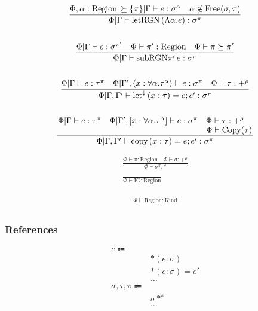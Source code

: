 \documentclass {article}
\begin{document}
\begin{gather*}
\frac
{\Phi , \alpha : \text{Region} \, \succeq \{ \pi \} | \Gamma \vdash e : \sigma^\alpha \quad \alpha \notin \text{Free}(\sigma, \pi)}
{\Phi | \Gamma \vdash \text{letRGN} \, (\Lambda \alpha. e) : \sigma^\pi} \\
\\
\frac
{\Phi | \Gamma \vdash e : \sigma^{\pi'} \quad \Phi \vdash \pi' : \text{Region} \quad \Phi \vdash \pi \succeq \pi' }
{\Phi | \Gamma \vdash \text{subRGN} \pi' \, e : \sigma^{\pi} } \\
\\
\frac
{\Phi | \Gamma \vdash e : \tau^\pi \quad \Phi | \Gamma', \langle x : \forall \alpha. \tau^\alpha \rangle \vdash e : \sigma^\pi \quad \Phi \vdash \tau : +^{\rho}}
{\Phi | \Gamma, \Gamma' \vdash \text{let}^\downarrow \, (x : \tau) = e; e' : \sigma^\pi} \\
\\
\frac
{\splitfrac{\Phi | \Gamma \vdash e : \tau^\pi \quad \Phi | \Gamma', [ x : \forall \alpha. \tau^\alpha ] \vdash e : \sigma^\pi \quad \Phi \vdash \tau : +^{\rho}}
{\Phi \vdash \text{Copy}(\tau)}}
{\Phi | \Gamma, \Gamma' \vdash \text{copy} \, (x : \tau) = e; e' : \sigma^\pi} \\
\end{gather*}

\begin{gather*}
\frac
{\Phi \vdash \pi : \text{Region} \quad \Phi \vdash \sigma : +^\rho}
{\Phi \vdash \sigma^\pi : *} \\
\\
\frac
{}
{\Phi \vdash \text{IO} : \text{Region}}
\end{gather*}

\begin{gather*}
\frac
{}
{\Phi \vdash \text{Region} : \text{Kind}} \\
\end{gather*}

\subsubsection{References}
\begin{align*}
e \Coloneqq & \\
& *(e : \sigma) \tag{Read Pointer} \\
& *(e : \sigma) = e' \tag{Write Pointer} \\
& \dots \\
\sigma, \tau, \pi \Coloneqq & \\
& \sigma *^\pi \tag{Reference} \\
& \dots \\
\end{align*}
\end{document}
